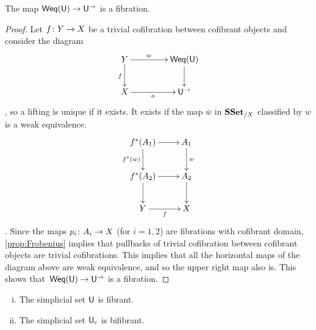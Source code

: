 \documentclass[reqno,10pt,a4paper,oneside,draft]{amsart}
\begin{document}
\begin{lemma} \label{thm:lemma-for-u} The map $\mathsf{Weq}(\mathsf{U}) \rightarrow \mathsf{U}^\to$ is a fibration.
\end{lemma}


\begin{proof}  Let $f \colon Y \to X$ be a trivial cofibration between cofibrant objects and consider the diagram
\[ 
\xymatrix@C=1.5cm{ Y \ar[d]_f \ar[r]^-{w} & \mathsf{Weq}(\U) \ar[d] \\
X \ar[r]_-{a} & \U^{\rightarrow} }
\]
, so a lifting is unique if it exists. It exists if the map $\bar{w}$ in $\mathbf{SSet}_{/X}$ classified by $w$ is a weak equivalence. 
\[ 
\xymatrix{ 
f^*(A_1) \ar[d]_{f^*(w)}  \ar[r]  & A_1 \ar[d]^{w} \\
f^*(A_2) \ar[r] \ar[d]   & A_2 \ar[d] \\
Y \ar[r]_f & X }
\]
.
Since the maps $p_i \colon A_i \rightarrow X$ (for $i = 1, 2$) are fibrations with cofibrant domain, \cref{prop:Frobenius} implies that pullbacks of trivial cofibration between cofibrant objects 
 are trivial cofibrations. This implies that all the horizontal maps of the diagram above are weak equivalence, and so the upper right map also is. This shows that~$\mathsf{Weq}(\mathsf{U}) \rightarrow \mathsf{U}^{\rightarrow}$ is a fibration.
\end{proof}


\begin{theorem} \label{thm:fibrancy-of-u-and-uc} \hfill 
\begin{enumerate}[(i)] 
\item The simplicial set $\mathsf{U}$ is fibrant. 
\item The simplicial set $\mathsf{U}_c$ is bifibrant. 
\end{enumerate}
\end{theorem}
\end{document}
